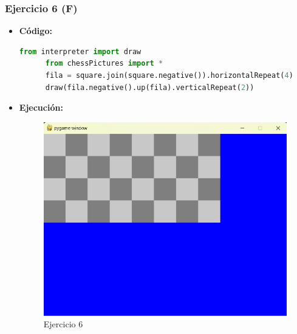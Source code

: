 \documentclass{article}
\begin{document}
  \subsubsection{Ejercicio 6 (F)}
  \begin{itemize}
    \item \textbf{Código:}
    \begin{lstlisting}[language=Python, caption=Ejercicio2f]
      from interpreter import draw
      from chessPictures import *
      fila = square.join(square.negative()).horizontalRepeat(4)
      draw(fila.negative().up(fila).verticalRepeat(2))
    \end{lstlisting}
    \item \textbf{Ejecución:}  
    \begin{figure}[H]
      \centering
      \includegraphics[width=1\textwidth, keepaspectratio]{img/ejercicio2f.png}
      \caption{Ejercicio 6}
    \end{figure}
  \end{itemize}
  \newpage

\end{document}
